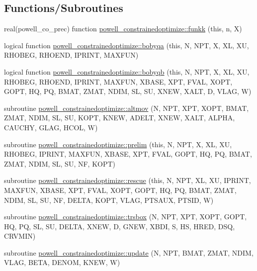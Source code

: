 \subsection*{Functions/\+Subroutines}
\begin{DoxyCompactItemize}
\item 
real(powell\+\_\+co\+\_\+prec) function \mbox{\hyperlink{namespacepowell__constrainedoptimize_ae7f7153e98c2ba47f65f71c04dfdc6b6}{powell\+\_\+constrainedoptimize\+::funkk}} (this, n, X)
\item 
logical function \mbox{\hyperlink{namespacepowell__constrainedoptimize_a18b806fe9f14b759021a23344e46743a}{powell\+\_\+constrainedoptimize\+::bobyqa}} (this, N, N\+PT, X, XL, XU, R\+H\+O\+B\+EG, R\+H\+O\+E\+ND, I\+P\+R\+I\+NT, M\+A\+X\+F\+UN)
\item 
logical function \mbox{\hyperlink{namespacepowell__constrainedoptimize_a7c19fea82c74411b0aa5dc322b397049}{powell\+\_\+constrainedoptimize\+::bobyqb}} (this, N, N\+PT, X, XL, XU, R\+H\+O\+B\+EG, R\+H\+O\+E\+ND, I\+P\+R\+I\+NT, M\+A\+X\+F\+UN, X\+B\+A\+SE, X\+PT, F\+V\+AL, X\+O\+PT, G\+O\+PT, HQ, PQ, B\+M\+AT, Z\+M\+AT, N\+D\+IM, SL, SU, X\+N\+EW, X\+A\+LT, D, V\+L\+AG, W)
\item 
subroutine \mbox{\hyperlink{namespacepowell__constrainedoptimize_ad592264ce63370c7014ab5883330e26d}{powell\+\_\+constrainedoptimize\+::altmov}} (N, N\+PT, X\+PT, X\+O\+PT, B\+M\+AT, Z\+M\+AT, N\+D\+IM, SL, SU, K\+O\+PT, K\+N\+EW, A\+D\+E\+LT, X\+N\+EW, X\+A\+LT, A\+L\+P\+HA, C\+A\+U\+C\+HY, G\+L\+AG, H\+C\+OL, W)
\item 
subroutine \mbox{\hyperlink{namespacepowell__constrainedoptimize_a8e5256bd13e2e03b0e1dda0e1ff3ef1f}{powell\+\_\+constrainedoptimize\+::prelim}} (this, N, N\+PT, X, XL, XU, R\+H\+O\+B\+EG, I\+P\+R\+I\+NT, M\+A\+X\+F\+UN, X\+B\+A\+SE, X\+PT, F\+V\+AL, G\+O\+PT, HQ, PQ, B\+M\+AT, Z\+M\+AT, N\+D\+IM, SL, SU, NF, K\+O\+PT)
\item 
subroutine \mbox{\hyperlink{namespacepowell__constrainedoptimize_a2a5e8cfa32743f237ece75e1b4d00469}{powell\+\_\+constrainedoptimize\+::rescue}} (this, N, N\+PT, XL, XU, I\+P\+R\+I\+NT, M\+A\+X\+F\+UN, X\+B\+A\+SE, X\+PT, F\+V\+AL, X\+O\+PT, G\+O\+PT, HQ, PQ, B\+M\+AT, Z\+M\+AT, N\+D\+IM, SL, SU, NF, D\+E\+L\+TA, K\+O\+PT, V\+L\+AG, P\+T\+S\+A\+UX, P\+T\+S\+ID, W)
\item 
subroutine \mbox{\hyperlink{namespacepowell__constrainedoptimize_a8d96126f07f9d909b52d61690eaa4c80}{powell\+\_\+constrainedoptimize\+::trsbox}} (N, N\+PT, X\+PT, X\+O\+PT, G\+O\+PT, HQ, PQ, SL, SU, D\+E\+L\+TA, X\+N\+EW, D, G\+N\+EW, X\+B\+DI, S, HS, H\+R\+ED, D\+SQ, C\+R\+V\+M\+IN)
\item 
subroutine \mbox{\hyperlink{namespacepowell__constrainedoptimize_aea17c033c10b38991c1484dfd380b3b1}{powell\+\_\+constrainedoptimize\+::update}} (N, N\+PT, B\+M\+AT, Z\+M\+AT, N\+D\+IM, V\+L\+AG, B\+E\+TA, D\+E\+N\+OM, K\+N\+EW, W)
\end{DoxyCompactItemize}
